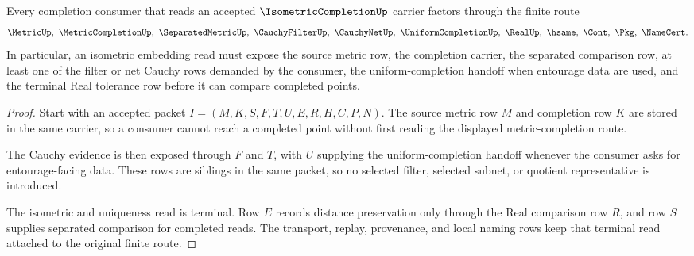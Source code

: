 \begin{theorem}
\label{thm:isometric-completion-universal-route}
Every completion consumer that reads an accepted $\IsometricCompletionUp$ carrier factors through the finite route
$$
\MetricUp,\ \MetricCompletionUp,\ \SeparatedMetricUp,\ \CauchyFilterUp,\ \CauchyNetUp,\ \UniformCompletionUp,\ \RealUp,\ \hsame,\ \Cont,\ \Pkg,\ \NameCert .
$$
In particular, an isometric embedding read must expose the source metric row, the completion carrier, the separated comparison row, at least one of the filter or net Cauchy rows demanded by the consumer, the uniform-completion handoff when entourage data are used, and the terminal Real tolerance row before it can compare completed points.
\end{theorem}
\begin{proof}
Start with an accepted packet $I=(M,K,S,F,T,U,E,R,H,C,P,N)$. The source metric row $M$ and completion row $K$ are stored in the same carrier, so a consumer cannot reach a completed point without first reading the displayed metric-completion route.

The Cauchy evidence is then exposed through $F$ and $T$, with $U$ supplying the uniform-completion handoff whenever the consumer asks for entourage-facing data. These rows are siblings in the same packet, so no selected filter, selected subnet, or quotient representative is introduced.

The isometric and uniqueness read is terminal. Row $E$ records distance preservation only through the Real comparison row $R$, and row $S$ supplies separated comparison for completed reads. The transport, replay, provenance, and local naming rows keep that terminal read attached to the original finite route.
\end{proof}




